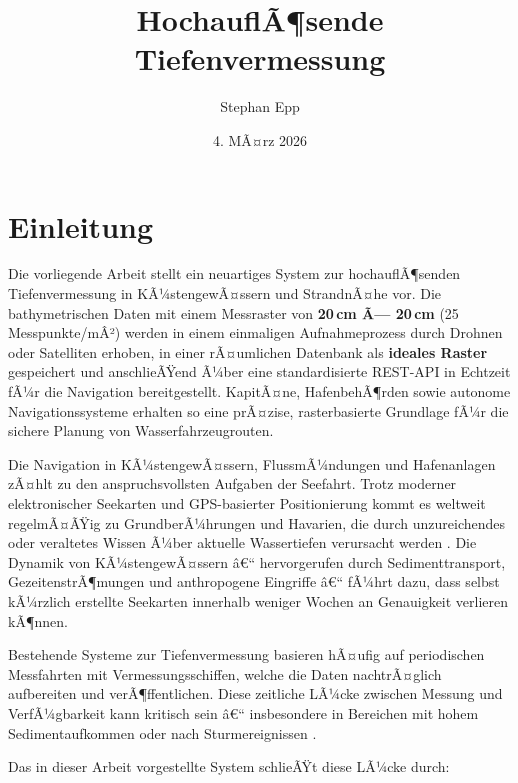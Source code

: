 ﻿\documentclass[a4paper,12pt]{article}
\title{HochauflÃ¶sende Tiefenvermessung}
\author{Stephan Epp}
\date{4. MÃ¤rz 2026}
\theoremstyle{definition}
\begin{document}

\maketitle

\tableofcontents
\newpage

\section{Einleitung}
Die vorliegende Arbeit stellt ein neuartiges System zur hochauflÃ¶senden Tiefenvermessung
in KÃ¼stengewÃ¤ssern und StrandnÃ¤he vor. Die bathymetrischen Daten mit einem Messraster
von \textbf{20\,cm Ã— 20\,cm} (25 Messpunkte/mÂ²) werden in einem einmaligen Aufnahmeprozess
durch Drohnen oder Satelliten erhoben, in einer rÃ¤umlichen Datenbank als \textbf{ideales Raster}
gespeichert und anschlieÃŸend Ã¼ber eine standardisierte REST-API in Echtzeit fÃ¼r die Navigation
bereitgestellt. KapitÃ¤ne, HafenbehÃ¶rden sowie autonome Navigationssysteme erhalten so eine
prÃ¤zise, rasterbasierte Grundlage fÃ¼r die sichere Planung von Wasserfahrzeugrouten.

Die Navigation in KÃ¼stengewÃ¤ssern, FlussmÃ¼ndungen und Hafenanlagen zÃ¤hlt zu den
anspruchsvollsten Aufgaben der Seefahrt. Trotz moderner elektronischer Seekarten und
GPS-basierter Positionierung kommt es weltweit regelmÃ¤ÃŸig zu GrundberÃ¼hrungen und
Havarien, die durch unzureichendes oder veraltetes Wissen Ã¼ber aktuelle Wassertiefen
verursacht werden \cite{iho2020, imocircular}. Die Dynamik von KÃ¼stengewÃ¤ssern â€“
hervorgerufen durch Sedimenttransport, GezeitenstrÃ¶mungen und anthropogene Eingriffe â€“
fÃ¼hrt dazu, dass selbst kÃ¼rzlich erstellte Seekarten innerhalb weniger Wochen an Genauigkeit
verlieren kÃ¶nnen.

\medskip\noindent
Bestehende Systeme zur Tiefenvermessung basieren hÃ¤ufig auf periodischen Messfahrten
mit Vermessungsschiffen, welche die Daten nachtrÃ¤glich aufbereiten und verÃ¶ffentlichen.
Diese zeitliche LÃ¼cke zwischen Messung und VerfÃ¼gbarkeit kann kritisch sein â€“ insbesondere
in Bereichen mit hohem Sedimentaufkommen oder nach Sturmereignissen
\cite{minkoff2019, guenther2000}.

\medskip\noindent
Das in dieser Arbeit vorgestellte System schlieÃŸt diese LÃ¼cke durch:
\end{document}
